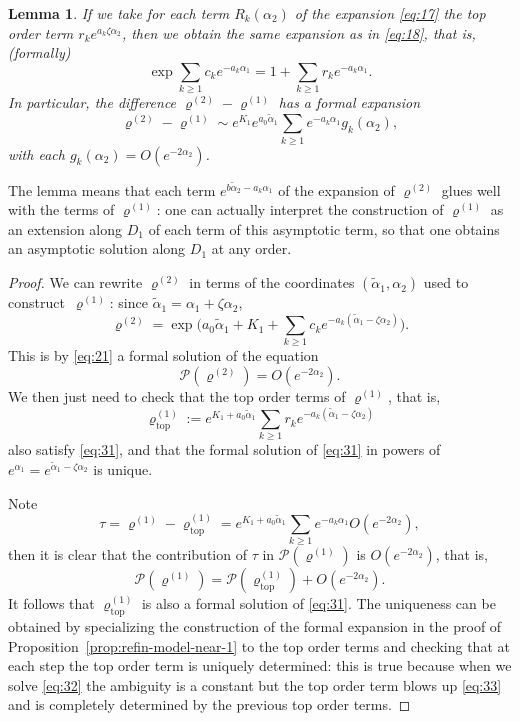\documentclass[10pt]{amsart}
\newcommand{\topo}{\mathrm{top}}
\theoremstyle{plain}
\newtheorem{lem}[thm]{Lemma}
\theoremstyle{definition}
\newcommand{\ta}{\tilde \alpha}
\newcommand{\opP}{\mathcal{P}}
\newcommand{\rhodeux}{\varrho^{(2)}}
\newcommand{\rhoun}{\varrho^{(1)}}
\begin{document}
\begin{lem}
\label{lem:est-diff}
If we take for each term $R_k(\alpha_2)$ of the expansion \eqref{eq:17} the top order term $r_ke^{a_k\zeta \alpha_2}$, then we obtain the same expansion as in \eqref{eq:18}, that is, (formally)
\[ \exp \sum_{k\ge1} c_k e^{-a_k\alpha_1} = 1+\sum_{k\geq1} r_k e^{-a_k\alpha_1}. \]
In particular, the difference $\rhodeux-\rhoun$ has a formal expansion
\[ \rhodeux - \rhoun \sim e^{K_1}e^{a_0\ta_1} \sum_{k\geq1} e^{-a_k\alpha_1} g_k(\alpha_2),\]
with each $g_k(\alpha_2)=O(e^{-2\alpha_2})$.
\end{lem}

The lemma means that each term $e^{b\ta_2-a_k\alpha_1}$ of the expansion of $\rhodeux$ glues well with the terms of $\rhoun$: one can actually interpret the construction of $\rhoun$ as an extension along $D_1$ of each term of this asymptotic term, so that one obtains an asymptotic solution along $D_1$ at any order.

\begin{proof}
We can rewrite $\varrho^{(2)}$ in terms of the coordinates $(\tilde\alpha_1,\alpha_2)$ used to construct~$\varrho^{(1)}$: since $\tilde\alpha_1=\alpha_1+\zeta\alpha_2$,
\[ \varrho^{(2)}=\exp\Big(a_0\tilde\alpha_1+K_1+\sum_{k\geq1}c_ke^{-a_k(\tilde\alpha_1-\zeta\alpha_2)}\Big).\]
This is by \eqref{eq:21} a formal solution of the equation
\begin{equation}
\opP(\varrho^{(2)}) = O(e^{-2\alpha_2}).\label{eq:31}
\end{equation}
We then just need to check that the top order terms of $\varrho^{(1)}$, that is,
\[ \varrho^{(1)}_{\topo} := e^{K_1+a_0\tilde\alpha_1} \sum_{k\geq1} r_k e^{-a_k(\tilde\alpha_1-\zeta\alpha_2)} \]
also satisfy \eqref{eq:31}, and that the formal solution of \eqref{eq:31} in powers of $e^{\alpha_1}=e^{\tilde\alpha_1-\zeta\alpha_2}$ is unique.

Note \[ \tau=\varrho^{(1)}-\varrho^{(1)}_{\topo}=e^{K_1+a_0\tilde\alpha_1}\sum_{k\geq1}e^{-a_k\alpha_1}O(e^{-2\alpha_2}), \]
then it is clear that the contribution of $\tau$ in $\opP(\varrho^{(1)})$ is $O(e^{-2\alpha_2})$, that is,
\[ \opP(\varrho^{(1)}) = \opP(\varrho^{(1)}_{\topo}) + O(e^{-2\alpha_2}). \]
It follows that $\varrho^{(1)}_{\topo}$ is also a formal solution of \eqref{eq:31}. The uniqueness can be obtained by specializing the construction of the formal expansion in the proof of Proposition~\ref{prop:refin-model-near-1} to the top order terms and checking that at each step the top order term is uniquely determined: this is true because when we solve \eqref{eq:32} the ambiguity is a constant but the top order term blows up \eqref{eq:33} and is completely determined by the previous top order terms.
\end{proof}
\end{document}
